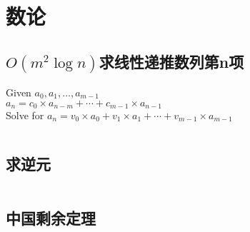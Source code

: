 \chapter{数论}
\section{$O(m^2\log n)$求线性递推数列第n项}
Given $a_0, a_1, \ldots, a_{m - 1}$\\
	$a_n = c_0 \times a_{n - m} + \cdots + c_{m - 1} \times a_{n - 1}$\\
	Solve for $a_n = v_0 \times a_0 + v_1 \times a_1 + \cdots + v_{m - 1} \times a_{m - 1}$\\
\inputminted{cpp}{\source/number-theory/linear-recurrence.cpp}
\section{求逆元}
\inputminted{cpp}{\source/number-theory/get-inversion.cpp}
\section{中国剩余定理}
\inputminted{cpp}{\source/number-theory/chinese-remainder-theorem.cpp}
